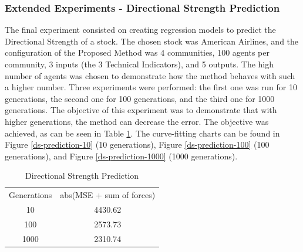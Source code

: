 \documentclass[12pt,journal,compsoc]{IEEEtran}
\begin{document}
\subsubsection{Extended Experiments - Directional Strength Prediction}
  
The final experiment consisted on creating regression models to predict the Directional Strength of a stock. The chosen stock was American Airlines, and the configuration of the Proposed Method was 4 communities, 100 agents per community, 3 inputs (the 3 Technical Indicators), and 5 outputs. The high number of agents was chosen to demonstrate how the method behaves with such a higher number. Three experiments were performed: the first one was run for 10 generations, the second one for 100 generations, and the third one for 1000 generations. The objective of this experiment was to demonstrate that with higher generations, the method can decrease the error. The objective was achieved, as can be seen in Table \ref{ds-mse-table}. The curve-fitting charts can be found in Figure \ref{ds-prediction-10} (10 generations), Figure \ref{ds-prediction-100} (100 generations), and Figure \ref{ds-prediction-1000} (1000 generations).

\begin{table}
    \caption{{Directional Strength Prediction}}
    \label{ds-mse-table}
    \begin{tabular}{ c c }
        Generations & abs(MSE + sum of forces) \\ 
        10 & 4430.62 \\ 
        100 & 2573.73 \\ 
        1000 & 2310.74 \\ 
    \end{tabular} 
\end{table}
  
  
  
  
  
  
  
  
  
  
  
  
  
  
  
  
  
  
  
  
  
  
  
  
  
  
  
  
  
  
  
  
  
\end{document}
